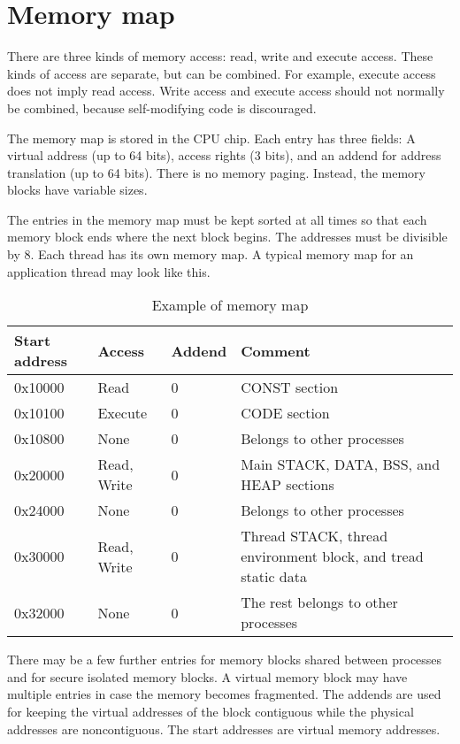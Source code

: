 \documentclass[forwardcom.tex]{subfiles}
\begin{document}
\section{Memory map}
There are three kinds of memory access: read, write and execute access. These kinds of access are separate, but can be combined. For example, execute access does not imply read access. Write access and execute access should not normally be combined, because self-modifying code is discouraged.
\vspace{2mm}

The memory map is stored in the CPU chip. Each entry has three fields: A virtual address (up to 64 bits), access rights (3 bits), and an addend for address translation (up to 64 bits). There is no memory paging. Instead, the memory blocks have variable sizes.
\vspace{2mm}

The entries in the memory map must be kept sorted at all times so that each memory block ends where the next block begins. The addresses must be divisible by 8. Each thread has its own memory map. A typical memory map for an application thread may look like this.

\begin{longtable} {|p{22mm}|p{20mm}|p{20mm}|p{70mm}|}
\caption{Example of memory map} \\
\endfirsthead
\endhead
\hline
\bfseries Start address & \bfseries Access & \bfseries Addend & \bfseries Comment  \\
\hline
0x10000   & Read    & 0 & CONST section \\
0x10100   & Execute & 0 & CODE section \\
0x10800   & None    & 0 & Belongs to other processes \\
0x20000   & Read, Write & 0 & Main STACK, DATA, BSS, and HEAP sections \\
0x24000   & None    & 0 & Belongs to other processes \\
0x30000   & Read, Write & 0 & Thread STACK, thread environment block, and tread static data \\
0x32000   & None    & 0 & The rest belongs to other processes \\
\hline
\end{longtable}

There may be a few further entries for memory blocks shared between processes and for secure isolated memory blocks. A virtual memory block may have multiple entries in case the memory becomes fragmented. The addends are used for keeping the virtual addresses of the block contiguous while the physical addresses are noncontiguous. The start addresses are virtual memory addresses.
\vspace{2mm}
\end{document}
